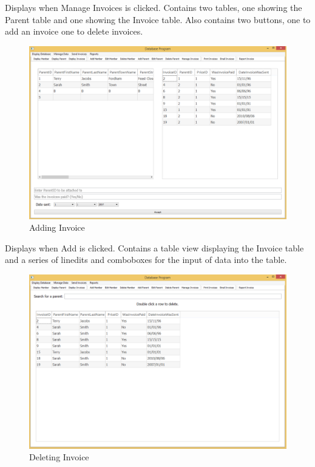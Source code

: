 Displays when Manage Invoices is clicked. Contains two tables, one showing the Parent table and one showing the Invoice table. Also contains two buttons, one to add an invoice one to delete invoices.

\begin{figure}[H]
\includegraphics[width=\textwidth]{./Maintenance/Images/AddInvoice.png}
    \caption{Adding Invoice} \label{fig:add_invoice}
\end{figure}

Displays when Add is clicked. Contains a table view displaying the Invoice table and a series of linedits and comboboxes for the input of data into the table.

\begin{figure}[H]
\includegraphics[width=\textwidth]{./Maintenance/Images/DeleteInvoice.png}
    \caption{Deleting Invoice} \label{fig:delete_invoice}
\end{figure}

